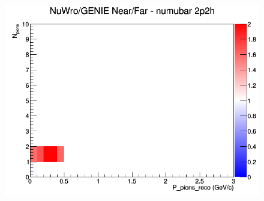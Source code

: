 \documentclass[12pt]{article}
\begin{document}
\begin{figure}[h]
\endminipage
{}
\includegraphics[width=\linewidth]{eff_N_P/LAr/pions/ratios/2p2h_NuWro_GENIE_numubar_NF_N_P.png}
\endminipage
\newline
\end{figure}
\clearpage
\end{document}

